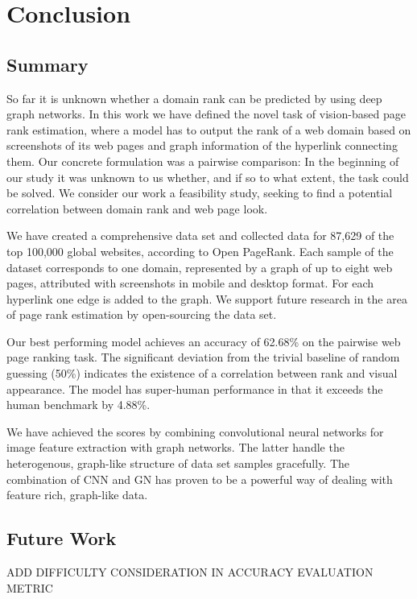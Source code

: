 \section{Conclusion}
\label{sec:conclusion}

\subsection{Summary}

So far it is unknown whether a domain rank can be predicted by using deep graph networks. In this work we have defined the novel task of vision-based page rank estimation, where a model has to output the rank of a web domain based on screenshots of its web pages and graph information of the hyperlink connecting them. Our concrete formulation was a pairwise comparison: In the beginning of our study it was unknown to us whether, and if so to what extent, the task could be solved. We consider our work a feasibility study, seeking to find a potential correlation between domain rank and web page look.

We have created a comprehensive data set and collected data for 87,629 of the top 100,000 global websites, according to Open PageRank. Each sample of the dataset corresponds to one domain, represented by a graph of up to eight web pages, attributed with screenshots in mobile and desktop format. For each hyperlink one edge is added to the graph. We support future research in the area of page rank estimation by open-sourcing the data set.

Our best performing model achieves an accuracy of 62.68\% on the pairwise web page ranking task. The significant deviation from the trivial baseline of random guessing (50\%) indicates the existence of a correlation between rank and visual appearance. The model has super-human performance in that it exceeds the human benchmark by 4.88\%.

We have achieved the scores by combining convolutional neural networks for image feature extraction with graph networks. The latter handle the heterogenous, graph-like structure of data set samples gracefully. The combination of CNN and GN has proven to be a powerful way of dealing with feature rich, graph-like data.

\subsection{Future Work}

ADD DIFFICULTY CONSIDERATION IN ACCURACY EVALUATION METRIC

